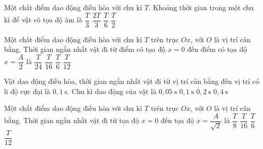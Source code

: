 \begin{ex}
Một chất điểm dao động điều hòa với chu kì $T$. Khoảng thời gian trong một chu kì để vật có tọa độ âm là
\choice
{$\dfrac{T}{3}$}
{$\dfrac{2T}{3}$}
{$\dfrac{T}{6}$}
{\True $\dfrac{T}{2}$}
\end{ex}

\begin{ex}
Một chất điểm dao động điều hòa với chu kì $T$ trên trục $Ox$, với $O$ là vị trí cân bằng. Thời gian ngắn nhất vật đi từ điểm có tọa độ $x=0$ đến điểm có tọa độ $x=\dfrac{A}{2}$ là
\choice
{$\dfrac{T}{24}$}
{$\dfrac{T}{16}$}
{$\dfrac{T}{6}$}
{\True $\dfrac{T}{12}$}
\end{ex}

\begin{ex}
Vật dao động điều hòa, thời gian ngắn nhất vật đi từ vị trí cân bằng đến vị trí có li độ cực đại là $0,1\ \text{s}$. Chu kì dao động của vật là
\choice
{$0,05\ \text{s}$}
{$0,1\ \text{s}$}
{$0,2\ \text{s}$}
{\True $0,4\ \text{s}$}
\end{ex}

\begin{ex}
Một chất điểm dao động điều hòa với chu kì $T$ trên trục $Ox$, với $O$ là vị trí cân bằng. Thời gian ngắn nhất vật đi từ tọa độ $x=0$ đến tọa độ $x=\dfrac{A}{\sqrt{2}}$ là
\choice
{\True $\dfrac{T}{8}$}
{$\dfrac{T}{16}$}
{$\dfrac{T}{6}$}
{$\dfrac{T}{12}$}
\end{ex}

